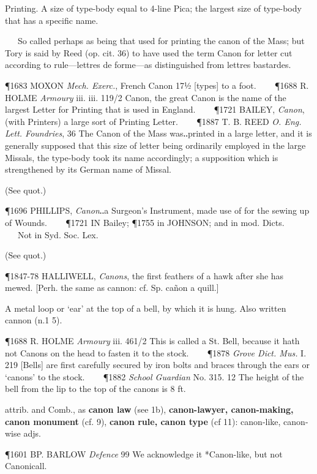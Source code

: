 \begin{description}[wide, labelwidth=!, labelindent=0pt]
\begin{myenumerate}
 Printing. A size of type-body equal to 4-line Pica; the largest size of type-body that has a specific name.

   So called perhaps as being that used for printing the canon of the Mass; but Tory is said by Reed (op. cit. 36) to have used the term Canon for letter cut according to rule—lettres de forme—as distinguished from lettres bastardes.

\P 1683 MOXON  \textit{Mech. Exerc.}, French Canon 17½ [types] to a foot.    
\P 1688 R. HOLME  \textit{Armoury} iii. iii. 119/2 Canon, the great Canon is the name of the largest Letter for Printing that is used in England.    
\P 1721 BAILEY,  \textit{Canon}, (with Printers) a large sort of Printing Letter.    
\P 1887 T. B. REED  \textit{O. Eng. Lett. Foundries}, 36 The Canon of the Mass was‥printed in a large letter, and it is generally supposed that this size of letter being ordinarily employed in the large Missals, the type-body took its name accordingly; a supposition which is strengthened by its German name of Missal.

 (See quot.)

\P 1696 PHILLIPS,  \textit{Canon}‥a Surgeon's Instrument, made use of for the sewing up of Wounds.    
\P 1721 IN Bailey;
\P 1755 in JOHNSON;  and in mod. Dicts.    Not in Syd. Soc. Lex.

 (See quot.)

\P 1847-78 HALLIWELL,  \textit{Canons}, the first feathers of a hawk after she has mewed. [Perh. the same as cannon: cf. Sp. cañon a quill.]

 A metal loop or ‘ear’ at the top of a bell, by which it is hung. Also written cannon (n.1 5).

\P 1688 R. HOLME  \textit{Armoury} iii. 461/2 This is called a St. Bell, because it hath not Canons on the head to fasten it to the stock.    
\P 1878 \textit{Grove  Dict. Mus.} I. 219 [Bells] are first carefully secured by iron bolts and braces through the ears or ‘canons’ to the stock.    
\P 1882 \textit{School  Guardian} No. 315. 12 The height of the bell from the lip to the top of the canons is 8 ft.

 attrib. and Comb., as \textbf{canon law} (see 1b), \textbf{canon-lawyer, canon-making, canon monument} (cf. 9), \textbf{canon rule, canon type} (cf 11): canon-like, canon-wise adjs.

\P 1601 BP. BARLOW  \textit{Defence} 99 We acknowledge it *Canon-like, but not Canonicall.


\end{myenumerate}
\end{description}

